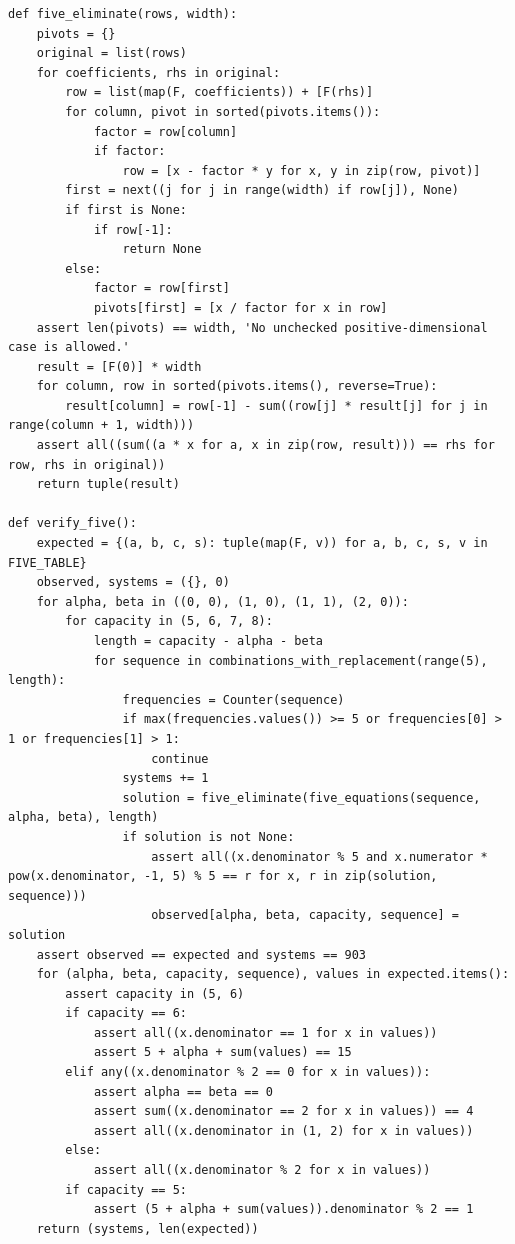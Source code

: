 \documentclass[11pt,a4paper]{article}
\theoremstyle{definition}
\numberwithin{equation}{section}
\begin{document}
\begin{Verbatim}[fontsize=\scriptsize]
def five_eliminate(rows, width):
    pivots = {}
    original = list(rows)
    for coefficients, rhs in original:
        row = list(map(F, coefficients)) + [F(rhs)]
        for column, pivot in sorted(pivots.items()):
            factor = row[column]
            if factor:
                row = [x - factor * y for x, y in zip(row, pivot)]
        first = next((j for j in range(width) if row[j]), None)
        if first is None:
            if row[-1]:
                return None
        else:
            factor = row[first]
            pivots[first] = [x / factor for x in row]
    assert len(pivots) == width, 'No unchecked positive-dimensional case is allowed.'
    result = [F(0)] * width
    for column, row in sorted(pivots.items(), reverse=True):
        result[column] = row[-1] - sum((row[j] * result[j] for j in range(column + 1, width)))
    assert all((sum((a * x for a, x in zip(row, result))) == rhs for row, rhs in original))
    return tuple(result)

def verify_five():
    expected = {(a, b, c, s): tuple(map(F, v)) for a, b, c, s, v in FIVE_TABLE}
    observed, systems = ({}, 0)
    for alpha, beta in ((0, 0), (1, 0), (1, 1), (2, 0)):
        for capacity in (5, 6, 7, 8):
            length = capacity - alpha - beta
            for sequence in combinations_with_replacement(range(5), length):
                frequencies = Counter(sequence)
                if max(frequencies.values()) >= 5 or frequencies[0] > 1 or frequencies[1] > 1:
                    continue
                systems += 1
                solution = five_eliminate(five_equations(sequence, alpha, beta), length)
                if solution is not None:
                    assert all((x.denominator % 5 and x.numerator * pow(x.denominator, -1, 5) % 5 == r for x, r in zip(solution, sequence)))
                    observed[alpha, beta, capacity, sequence] = solution
    assert observed == expected and systems == 903
    for (alpha, beta, capacity, sequence), values in expected.items():
        assert capacity in (5, 6)
        if capacity == 6:
            assert all((x.denominator == 1 for x in values))
            assert 5 + alpha + sum(values) == 15
        elif any((x.denominator % 2 == 0 for x in values)):
            assert alpha == beta == 0
            assert sum((x.denominator == 2 for x in values)) == 4
            assert all((x.denominator in (1, 2) for x in values))
        else:
            assert all((x.denominator % 2 for x in values))
        if capacity == 5:
            assert (5 + alpha + sum(values)).denominator % 2 == 1
    return (systems, len(expected))


\end{Verbatim}
\end{document}
